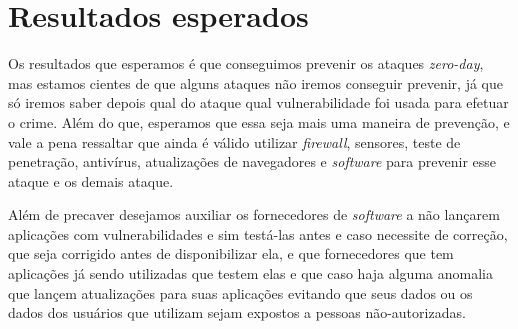 \section{Resultados esperados}
Os resultados que esperamos é que conseguimos prevenir os ataques \textit{zero-day}, mas estamos cientes de
que alguns ataques não iremos conseguir prevenir, já que só iremos saber depois qual do ataque qual vulnerabilidade foi 
usada para efetuar o crime. Além do que, esperamos que essa seja mais uma maneira de prevenção, e vale a pena ressaltar 
que ainda é válido utilizar \textit{firewall}, sensores, teste de penetração, antivírus, atualizações de navegadores e 
\textit{software} para prevenir esse ataque e os demais ataque.

Além de precaver desejamos auxiliar os fornecedores de \textit{software} a não lançarem aplicações com 
vulnerabilidades e sim testá-las antes e caso necessite de correção, que seja corrigido antes de disponibilizar ela, e que fornecedores que tem aplicações já sendo utilizadas que testem elas e que caso haja alguma anomalia que 
lançem atualizações para suas aplicações evitando que seus dados ou os dados dos usuários que utilizam sejam 
expostos a pessoas não-autorizadas. 

